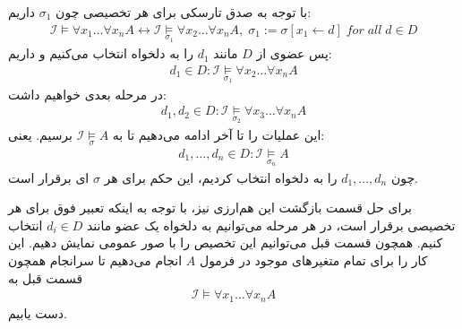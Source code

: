 \documentclass[]{exam}
\begin{document}
با توجه به صدق تارسکی برای هر تخصیصی چون 
$\sigma_1$
داریم:
\begin{align}
    \mathscr{I} \models \forall x_1 \dots \forall x_n A \longleftrightarrow
    \mathscr{I} \underset{\sigma_1}{\models} \forall x_2 \dots \forall x_n A, \; \sigma_1 := \sigma[x_1 \leftarrow d] \; for \; all \; d \in D
\end{align}
پس عضوی از 
$D$
 مانند 
$d_1$
را
به دلخواه انتخاب می‌کنیم 
و داریم:
\begin{align}
    d_1 \in D: \mathscr{I} \underset{\sigma_1}{\models} \forall x_2 \dots \forall x_n A
\end{align}
در مرحله بعدی خواهیم داشت:
\begin{align}
    d_1, d_2 \in D: \mathscr{I} \underset{\sigma_2}{\models} \forall x_3 \dots \forall x_n A
\end{align}
این عملیات را تا آخر ادامه می‌دهیم تا به
$\mathscr{I} \underset{\sigma}{\models} A$
برسیم. یعنی:
\begin{align}
    d_1, \dots, d_n \in D: \mathscr{I} \underset{\sigma_n}{\models} A
\end{align}
چون 
$d_1, \dots, d_n$
را به دلخواه انتخاب کردیم، این حکم برای هر 
$\sigma$
ای برقرار است.

برای حل قسمت بازگشت این هم‌ارزی نیز، با توجه به اینکه تعبیر فوق برای هر تخصیصی برقرار است،
در هر مرحله می‌توانیم به دلخواه یک عضو مانند
$d_i \in D$
انتخاب کنیم.
همچون قسمت قبل می‌توانیم این تخصیص را با صور عمومی نمایش دهیم. این کار را برای تمام متغیرهای موجود در 
فرمول 
$A$
انجام می‌دهیم تا سرانجام همچون قسمت قبل به 
\begin{align}
    \mathscr{I} \models \forall x_1 \dots \forall x_n A 
\end{align}
دست یابیم.
\end{document}
